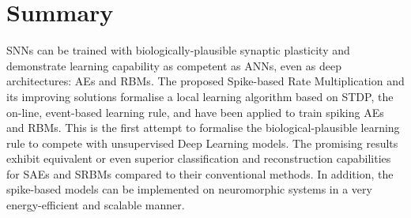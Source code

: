 
\section{Summary}
SNNs can be trained with biologically-plausible synaptic plasticity and demonstrate learning capability as competent as ANNs, even as deep architectures: AEs and RBMs.
The proposed Spike-based Rate Multiplication and its improving solutions formalise a local learning algorithm based on STDP, the on-line, event-based learning rule, and have been applied to train spiking AEs and RBMs.
This is the first attempt to formalise the biological-plausible learning rule to compete with unsupervised Deep Learning models.
The promising results exhibit equivalent or even superior classification and reconstruction capabilities for SAEs and SRBMs compared to their conventional methods.
In addition, the spike-based models can be implemented on neuromorphic systems in a very energy-efficient and scalable manner.
